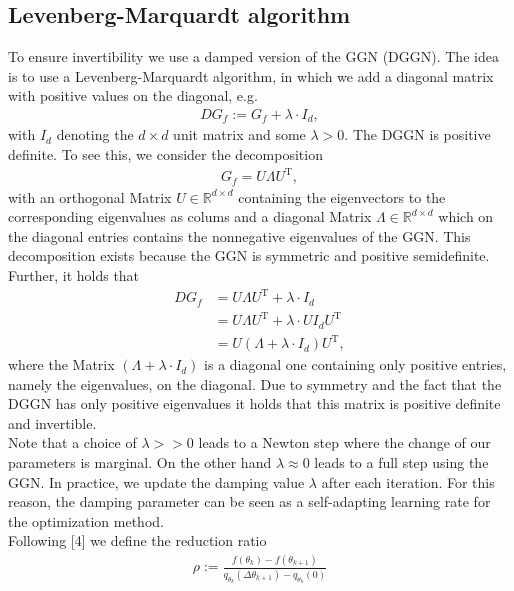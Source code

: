 \documentclass[conference]{IEEEtran}
\begin{document}
\subsection{Levenberg-Marquardt algorithm }
\noindent
To ensure invertibility we use a damped version of the GGN (DGGN). The idea is to use a Levenberg-Marquardt algorithm, in which we add a diagonal matrix with positive values on the diagonal, e.g.
\begin{align}
	DG_{f} := G_{f} + \lambda\cdot I_{d},
\end{align}
with $I_{d}$ denoting the $d\times d$ unit matrix and some $\lambda>0$.
The DGGN is positive definite.
To see this, we consider the decomposition
\begin{align}
	G_{f} = U\Lambda U^{\mathrm{T}},
\end{align}
with an orthogonal Matrix $U\in\mathbb{R}^{d\times d}$ containing the eigenvectors to the corresponding eigenvalues as colums and a diagonal Matrix $\Lambda\in\mathbb{R}^{d\times d}$ which on the diagonal entries contains the nonnegative eigenvalues of the GGN. 
This decomposition exists because the GGN is symmetric and positive semidefinite. Further, it holds that
\begin{align}
	DG_{f} &= U\Lambda U^{\mathrm{T}} + \lambda\cdot I_{d}\\
	&= U\Lambda U^{\mathrm{T}} + \lambda\cdot U I_{d}U^{\mathrm{T}}\\
	&= U\left(\Lambda + \lambda\cdot I_{d}\right)U^{\mathrm{T}},
\end{align}
where the Matrix $\left(\Lambda + \lambda\cdot I_{d}\right)$ is a diagonal one containing only positive entries, namely the eigenvalues, on the diagonal. Due to symmetry and the fact that the DGGN has only positive eigenvalues it holds that this matrix is positive definite and invertible.\\
Note that a choice of $\lambda>>0$ leads to a Newton step where the change of our parameters is marginal. On the other hand $\lambda\approx 0$ leads to a full step using the GGN. In practice, we update the damping value $\lambda$ after each iteration. For this reason, the damping parameter can be seen as a self-adapting learning rate for the optimization method.\\
Following [4] we define the reduction ratio
\begin{align}
	\rho := \frac{f(\theta_{k}) - f(\theta_{k+1})}{q_{\theta_{k}}(\Delta\theta_{k + 1}) - q_{\theta_{k}}(0)}
\end{align}
\end{document}
